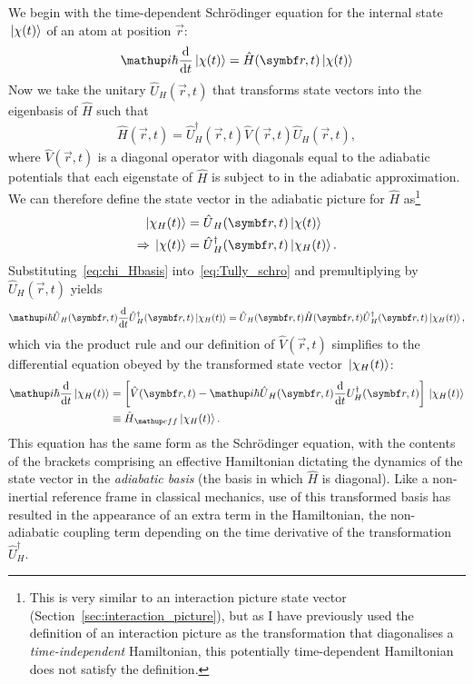We begin with the time-dependent Schr\"odinger equation for the internal state $\ket{\chi(t)}$ of an atom at position $\vec r$:
\begin{align}
\ii\hbar\dv{t}\ket{\chi(t)} = \hat H(\vec r, t)\ket{\chi(t)}\label{eq:Tully_schro}
\end{align}
Now we take the unitary $\hat U_H(\vec r, t)$ that transforms state vectors into the eigenbasis of $\hat H$ such that
\begin{align}\label{eq:U_H_definition}
\hat H(\vec r, t) = \hat U_H^\dagger(\vec r, t) \hat V(\vec r, t) \hat U_H(\vec r, t),
\end{align}
where $\hat V(\vec r, t)$ is a diagonal operator with diagonals equal to the adiabatic potentials that each eigenstate of $\hat H$ is subject to in the adiabatic approximation.
We can therefore define the state vector in the adiabatic picture for $\hat H$ as\footnote{This is very similar to an interaction picture state vector (Section~\ref{sec:interaction_picture}), but as I have previously used the definition of an interaction picture as the transformation that diagonalises a \emph{time-independent} Hamiltonian, this potentially time-dependent Hamiltonian does not satisfy the definition.}
\begin{align}\label{eq:chi_Hbasis}
\ket{\chi_H(t)} &= \hat U_H(\vec r, t)\ket{\chi(t)}\\
\Rightarrow \ket{\chi(t)} &= \hat U^\dagger_H(\vec r, t)\ket{\chi_H(t)}.
\end{align}
Substituting~\eqref{eq:chi_Hbasis} into~\eqref{eq:Tully_schro} and premultiplying by $\hat U_H(\vec r, t)$ yields
\begin{align}
\ii\hbar\hat U_H(\vec r, t)\dv{t}\hat U^\dagger_H(\vec r, t)\ket{\chi_H(t)} = \hat U_H(\vec r, t)\hat H(\vec r, t)\hat U^\dagger_H(\vec r, t)\ket{\chi_H(t)},
\end{align}
which via the product rule and our definition of $\hat V(\vec r, t)$ simplifies to the differential equation obeyed by the transformed state vector $\ket{\chi_H(t)}$:
\begin{align}\label{eq:Tully_adiabatic_schro}
\ii\hbar\dv{t}\ket{\chi_H(t)} &= \left[
  \hat V(\vec r, t)
  - \ii\hbar\hat U_H(\vec r, t)\dv{t}U^\dagger_H(\vec r, t)
 \right]\ket{\chi_H(t)}\\
 &\equiv \hat H_\up{eff} \ket{\chi_H(t)}.\label{eq:Tully_adiabatic_eff}
\end{align}
This equation has the same form as the Schr\"odinger equation, with the contents of the brackets comprising an effective Hamiltonian dictating the dynamics of the state vector in the \emph{adiabatic basis} (the basis in which $\hat H$ is diagonal). Like a non-inertial reference frame in classical mechanics, use of this transformed basis has resulted in the appearance of an extra term in the Hamiltonian, the non-adiabatic coupling term depending on the time derivative of the transformation $\hat U_H^\dagger$.

